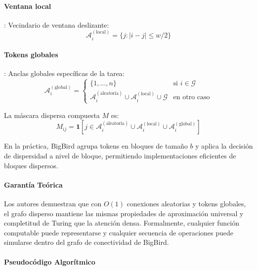 \paragraph{Ventana local}: Vecindario de ventana deslizante:
\[
\mathcal{A}_i^{(\text{local})} = \{j : |i-j| \leq w/2\}
\]

\paragraph{Tokens globales}: Anclas globales específicas de la tarea:
\[
\mathcal{A}_i^{(\text{global})} = \begin{cases}
\{1, \ldots, n\} & \text{si } i \in \mathcal{G} \\
\mathcal{A}_i^{(\text{aleatoria})} \cup \mathcal{A}_i^{(\text{local})} \cup \mathcal{G} & \text{en otro caso}
\end{cases}
\]

La máscara dispersa compuesta $M$ es:
\[
M_{ij} = \mathbf{1}[j \in \mathcal{A}_i^{(\text{aleatoria})} \cup \mathcal{A}_i^{(\text{local})} \cup \mathcal{A}_i^{(\text{global})}]
\]

En la práctica, BigBird agrupa tokens en bloques de tamaño $b$ y aplica la decisión de dispersidad a nivel de bloque, permitiendo implementaciones eficientes de bloques dispersos.

\paragraph{Garantía Teórica}

Los autores demuestran que con $O(1)$ conexiones aleatorias y tokens globales, el grafo disperso mantiene las mismas propiedades de aproximación universal y completitud de Turing que la atención densa. Formalmente, cualquier función computable puede representarse y cualquier secuencia de operaciones puede simularse dentro del grafo de conectividad de BigBird.

\paragraph{Pseudocódigo Algorítmico}

